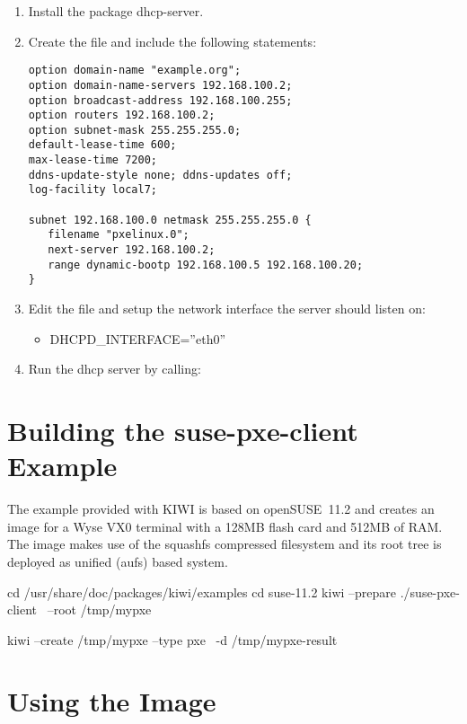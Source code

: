 \begin{enumerate}
\item Install the package dhcp-server.
\item Create the file  and include the following
      statements:
 
\begin{verbatim}
option domain-name "example.org";
option domain-name-servers 192.168.100.2;
option broadcast-address 192.168.100.255;
option routers 192.168.100.2;
option subnet-mask 255.255.255.0;
default-lease-time 600;
max-lease-time 7200;
ddns-update-style none; ddns-updates off;
log-facility local7;

subnet 192.168.100.0 netmask 255.255.255.0 {
   filename "pxelinux.0";
   next-server 192.168.100.2;
   range dynamic-bootp 192.168.100.5 192.168.100.20;
}
\end{verbatim}

\item Edit the file  and setup the network
      interface the server should listen on:
      \begin{itemize}
      \item DHCPD\_INTERFACE=''eth0''
      \end{itemize}
\item Run the dhcp server by calling:
\end{enumerate}

\section{Building the suse-pxe-client Example}

The example provided with KIWI is based on open\-SUSE~11.2 and creates an
image for a Wyse VX0 terminal with a 128MB flash card and 512MB of RAM.
The image makes use of the squashfs compressed filesystem and its
root tree is deployed as unified (aufs) based system. 

\begin{Command}{12cm}
cd /usr/share/doc/packages/kiwi/examples
cd suse-11.2
kiwi --prepare ./suse-pxe-client \
     --root /tmp/mypxe

kiwi --create /tmp/mypxe --type pxe \
     -d /tmp/mypxe-result
\end{Command}

\section{Using the Image}

